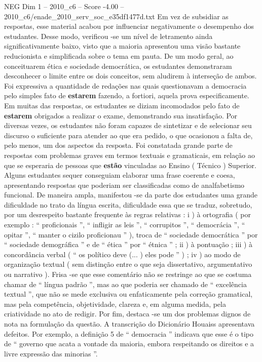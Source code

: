 \begin{textsample}{NEG Dim 1 – 2010\_c6 – Score -4.00 – 2010\_c6/enade\_2010\_serv\_soc\_e35df1477d.txt}
Em vez de subsidiar as respostas, esse material acabou por influenciar negativamente o desempenho dos estudantes.
Desse modo, verificou -se um nível de letramento ainda significativamente baixo, visto que a maioria apresentou uma visão bastante reducionista e simplificada sobre o tema em pauta.
De um modo geral, ao conceituarem ética e sociedade democrática, os estudantes demonstraram desconhecer o limite entre os dois conceitos, sem aludirem à interseção de ambos.
Foi expressiva a quantidade de redações nas quais questionavam a democracia pelo simples fato de \textbf{estarem} fazendo, a fortiori, aquela prova especificamente.
Em muitas das respostas, os estudantes se diziam incomodados pelo fato de \textbf{estarem} obrigados a realizar o exame, demonstrando sua insatisfação.
Por diversas vezes, os estudantes não foram capazes de sintetizar e de selecionar seu discurso o suficiente para atender ao que era pedido, o que ocasionou a falta de, pelo menos, um dos aspectos da resposta.
Foi constatada grande parte de respostas com problemas graves em termos textuais e gramaticais, em relação ao que se esperaria de pessoas que \textbf{estão} vinculadas ao Ensino ( Técnico ) Superior.
Alguns estudantes sequer conseguiam elaborar uma frase coerente e coesa, apresentando respostas que poderiam ser classificadas como de analfabetismo funcional.
De maneira ampla, manifestou -se da parte dos estudantes uma grande dificuldade no trato da língua escrita, dificuldade essa que se traduz, sobretudo, por um desrespeito bastante frequente às regras relativas : i ) à ortografia ( por exemplo : “ proficionais ”, “ infligir as leis ”, “ corrupitos ”, “ democrácia ”, “ opitar ”, “ manter o cizilo proficionau ” ), troca de “ sociedade democrática ” por “ sociedade demográfica ” e de “ ética ” por “ étnica ” ; ii ) à pontuação ; iii ) à concordância verbal ( “ os político deve (... ) eles pode ” ) ; iv ) ao modo de organização textual ( sem distinção entre o que seja dissertativo, argumentativo ou narrativo ).
Frisa -se que esse comentário não se restringe ao que se costuma chamar de “ língua padrão ”, mas ao que poderia ser chamado de “ excelência textual ”, que não se mede exclusiva ou enfaticamente pela correção gramatical, mas pela competência, objetividade, clareza e, em alguma medida, pela criatividade no ato de redigir.
Por fim, destaca -se um dos problemas dignos de nota na formulação da questão.
A transcrição do Dicionário Houaiss apresentava defeitos.
Por exemplo, a definição 5 de “ democracia ” indicava que esse é o tipo de “ governo que acata a vontade da maioria, embora respeitando os direitos e a livre expressão das minorias ”.

\end{textsample}
